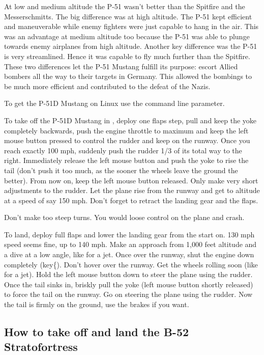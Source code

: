     At low and medium altitude the P-51 wasn't better than the Spitfire
    and the Messerschmitts. The big difference was at high altitude.
    The P-51 kept efficient and maneuverable while enemy fighters were
    just capable to hang in the air. This was an advantage at medium
    altitude too because the P-51 was able to plunge towards enemy
    airplanes from high altitude. Another key difference was the P-51
    is very streamlined. Hence it was capable to fly much further than
    the Spitfire. These two differences let the P-51 Mustang fulfill
    its purpose: escort Allied bombers all the way to their targets in
    Germany. This allowed the bombings to be much more efficient and
    contributed to the defeat of the Nazis.

    To get the P-51D Mustang on Linux use the
     command line parameter.

    To take off the P-51D Mustang in \FlightGear, deploy one flaps step, pull
    and keep the yoke completely backwards, push the engine throttle to
    maximum and keep the left mouse button pressed to control the
    rudder and keep on the runway. Once you reach exactly 100 mph,
    suddenly push the rudder 1/3 of its total way to the right.
    Immediately release the left mouse button and push the yoke to rise
    the tail (don't push it too much, as the sooner the wheels leave
    the ground the better). From now on, keep the left mouse button
    released. Only make very short adjustments to the rudder. Let the
    plane rise from the runway and get to altitude at a speed of say
    150 mph. Don't forget to retract the landing gear and the flaps.

Don't make too steep turns. You would loose control on the plane and crash.

To land, deploy full flaps and lower the landing gear from the start
on. 130 mph speed seems fine, up to 140 mph. Make an approach from
1,000 feet altitude and a dive at a low angle, like for a jet. Once
over the runway, shut the engine down completely (key{\{}). Don't hover
over the runway. Get the wheels rolling soon (like for a jet). Hold the
left mouse button down to steer the plane using the rudder. Once the
tail sinks in, briskly pull the yoke (left mouse button shortly
released) to force the tail on the runway. Go on steering the plane
using the rudder. Now the tail is firmly on the ground, use the brakes
if you want.

    \subsection{How to take off and land the B-52 Stratofortress}
    \label{sec:B52}

